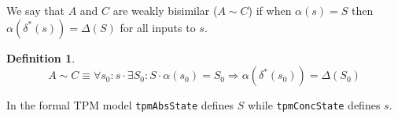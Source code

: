 \documentclass[10pt]{article}
\newtheorem{definition}{Definition}
\begin{document}
We say that $A$ and $C$ are weakly bisimilar ($A\sim C$) if when
$\alpha(s)=S$ then $\alpha(\delta^*(s))=\Delta(S)$ for all inputs to
$s$.

\begin{definition} 
  \[A\sim C \equiv \forall s_0:s \cdot \exists S_0:S \cdot
  \alpha(s_0)=S_0 \Rightarrow \alpha(\delta^*(s_0))=\Delta(S_0)\]
  \label{def:bisimulation}
\end{definition}

In the formal TPM model \texttt{tpmAbsState} defines $S$ while
\texttt{tpmConcState} defines $s$.

\appendix





\end{document}
